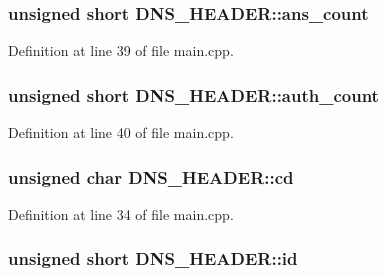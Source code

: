 \hypertarget{struct_d_n_s___h_e_a_d_e_r_abf109ef7bbba2e8145177411c6835faa}{
\subsubsection[{ans\-\_\-count}]{\setlength{\rightskip}{0pt plus 5cm}unsigned short D\-N\-S\-\_\-\-H\-E\-A\-D\-E\-R\-::ans\-\_\-count}}\label{struct_d_n_s___h_e_a_d_e_r_abf109ef7bbba2e8145177411c6835faa}


Definition at line 39 of file main.\-cpp.

\hypertarget{struct_d_n_s___h_e_a_d_e_r_aa8c1b1d176c5ff1ab2007af10cecccf7}{
\subsubsection[{auth\-\_\-count}]{\setlength{\rightskip}{0pt plus 5cm}unsigned short D\-N\-S\-\_\-\-H\-E\-A\-D\-E\-R\-::auth\-\_\-count}}\label{struct_d_n_s___h_e_a_d_e_r_aa8c1b1d176c5ff1ab2007af10cecccf7}


Definition at line 40 of file main.\-cpp.

\hypertarget{struct_d_n_s___h_e_a_d_e_r_af63c835c6ea830833207e2c8e3327fbd}{
\subsubsection[{cd}]{\setlength{\rightskip}{0pt plus 5cm}unsigned char D\-N\-S\-\_\-\-H\-E\-A\-D\-E\-R\-::cd}}\label{struct_d_n_s___h_e_a_d_e_r_af63c835c6ea830833207e2c8e3327fbd}


Definition at line 34 of file main.\-cpp.

\hypertarget{struct_d_n_s___h_e_a_d_e_r_a5ac83f81b8da8ddb83e3f5baf9a51e94}{
\subsubsection[{id}]{\setlength{\rightskip}{0pt plus 5cm}unsigned short D\-N\-S\-\_\-\-H\-E\-A\-D\-E\-R\-::id}}\label{struct_d_n_s___h_e_a_d_e_r_a5ac83f81b8da8ddb83e3f5baf9a51e94}


